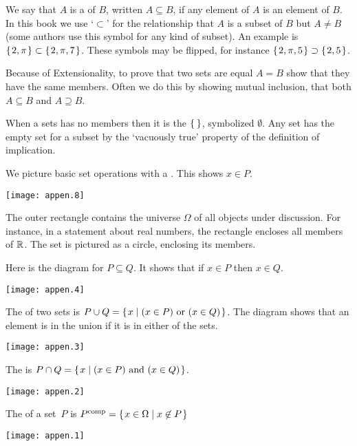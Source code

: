 We say that \( A \) is a  of \( B \), written
$A\subseteq B$, if any element of $A$ is an element of $B$.
In this book we use
`\( \subset \)' for the  %
relationship that \( A \) is a subset of \( B \) but \( A\neq B \)
(some authors use this symbol for any kind of subset).
An example is 
\( \mbox{$\{\hspace{0.1em}2,\pi\hspace{0.1em}\}$}\subset\mbox{$\{\hspace{0.1em}2,\pi,7\hspace{0.1em}\}$} \).
These symbols may be flipped, for instance
\( \mbox{$\{\hspace{0.1em} 2,\pi,5\hspace{0.1em}\}$}\supset\mbox{$\{\hspace{0.1em}2,5\hspace{0.1em}\}$} \).

Because of Extensionality, to prove that two sets are equal \( A=B \)
show that they have the same members.
Often we do this by showing mutual inclusion,%
that both \( A\subseteq B \) and \( A\supseteq B \).

When a sets has no members then it is
the  \( \set{} \),
symbolized \( \emptyset \).
Any set has the empty set for a subset by the `vacuously true'
property of the definition of implication.




We picture basic set operations with a
.
This shows \( x\in P \). 
\begin{center}
  \texttt{[image: appen.8]}
\end{center}
The outer rectangle contains the universe $\Omega$ of all objects under 
discussion.
For instance, in a statement about real numbers, the rectangle encloses all 
members of $\mathbb{R}$.
The set is pictured as a circle, enclosing its members.

Here is the diagram for \( P\subseteq Q \).
It shows that if \( x\in P \) then \( x\in Q \).
\begin{center}
  \texttt{[image: appen.4]}
\end{center}




The  of two sets is
\( P\cup Q=\mbox{$\{\hspace{0.1em}x\mid \text{$(x\in P)$ or $(x\in Q)$}\hspace{0.1em}\}$} \).
The diagram shows that an element is in the union if it is in either of the
sets.
\begin{center}
  \texttt{[image: appen.3]}
\end{center}
The  is
\( P\cap Q=\mbox{$\{\hspace{0.1em}x\mid \text{$(x\in P)$ and $(x\in Q)$}\hspace{0.1em}\}$} \).
\begin{center}
  \texttt{[image: appen.2]}
\end{center}
The 
of a set~\( P \) is
\( P^{\text{comp}}=\mbox{$\{\hspace{0.1em}x\in\Omega\mid x\not\in P\hspace{0.1em}\}$} \)
\begin{center}
  \texttt{[image: appen.1]}
\end{center}




